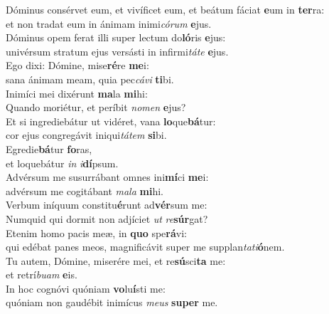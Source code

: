 \evenverse Dóminus consérvet eum, et vivíficet eum, et beátum fáciat \textbf{e}um in \textbf{ter}ra:~\*\\
\evenverse et non tradat eum in ánimam inimi\textit{có}\textit{rum} \textbf{e}jus.\\
\oddverse Dóminus opem ferat illi super lectum do\textbf{ló}ris \textbf{e}jus:~\*\\
\oddverse univérsum stratum ejus versásti in infirmi\textit{tá}\textit{te} \textbf{e}jus.\\
\evenverse Ego dixi: Dómine, mise\textbf{ré}re \textbf{me}i:~\*\\
\evenverse sana ánimam meam, quia pec\textit{cá}\textit{vi} \textbf{ti}bi.\\
\oddverse Inimíci mei dixérunt \textbf{ma}la \textbf{mi}hi:~\*\\
\oddverse Quando moriétur, et períbit \textit{no}\textit{men} \textbf{e}jus?\\
\evenverse Et si ingrediebátur ut vidéret, vana \textbf{lo}que\textbf{bá}tur:~\*\\
\evenverse cor ejus congregávit iniqui\textit{tá}\textit{tem} \textbf{si}bi.\\
\oddverse Egredie\textbf{bá}tur \textbf{fo}ras,~\*\\
\oddverse et loquebátur \textit{in} \textit{i}\textbf{dí}psum.\\
\evenverse Advérsum me susurrábant omnes ini\textbf{mí}ci \textbf{me}i:~\*\\
\evenverse advérsum me cogitábant \textit{ma}\textit{la} \textbf{mi}hi.\\
\oddverse Verbum iníquum constitu\textbf{é}runt ad\textbf{vér}sum me:~\*\\
\oddverse Numquid qui dormit non adjíciet \textit{ut} \textit{re}\textbf{súr}gat?\\
\evenverse Etenim homo pacis meæ, in \textbf{quo} spe\textbf{rá}vi:~\*\\
\evenverse qui edébat panes meos, magnificávit super me supplan\textit{ta}\textit{ti}\textbf{ó}nem.\\
\oddverse Tu autem, Dómine, miserére mei, et re\textbf{sú}sci\textbf{ta} me:~\*\\
\oddverse et retrí\textit{bu}\textit{am} \textbf{e}is.\\
\evenverse In hoc cognóvi quóniam \textbf{vo}lu\textbf{í}sti me:~\*\\
\evenverse quóniam non gaudébit inimícus \textit{me}\textit{us} \textbf{su}\textbf{per} me.\\
